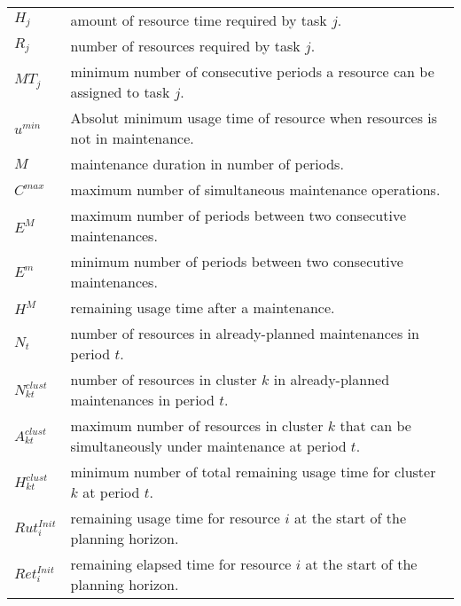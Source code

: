 \documentclass[a4paper,onecolumn,fleqn]{article}
\begin{document}
    \begin{tabular}{p{8mm}p{167mm}}
        $H_j$             & amount of resource time required by task $j$. \\
        $R_j$             & number of resources required by task $j$. \\
        $MT_j$            & minimum number of consecutive periods a resource can be assigned to task $j$. \\
        $u^{min}$       & Absolut minimum usage time of resource when resources is not in maintenance.\\
        $M$               & maintenance duration in number of periods. \\
        $C^{max}$         & maximum number of simultaneous maintenance operations. \\
        $E^{M}$         & maximum number of periods between two consecutive maintenances. \\
        $E^{m}$         & minimum number of periods between two consecutive maintenances. \\
        $H^{M}$               & remaining usage time after a maintenance. \\
        $N_t$             & number of resources in already-planned maintenances in period $t$.\\
        $N^{clust}_{kt}$         & number of resources in cluster $k$ in already-planned maintenances in period $t$.\\
        $A^{clust}_{kt}$         & maximum number of resources in cluster $k$ that can be simultaneously under maintenance at period $t$.\\
        $H^{clust}_{kt}$         & minimum number of total remaining usage time for cluster $k$ at period $t$.\\
        $Rut^{Init}_{i}$  & remaining usage time for resource $i$ at the start of the planning horizon. \\
        $Ret^{Init}_{i}$  & remaining elapsed time for resource $i$ at the start of the planning horizon. \\
    \end{tabular}
\end{document}
